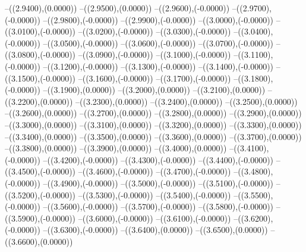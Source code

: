{	--({\sx*(2.9400)},{\sy*(0.0000)})
	--({\sx*(2.9500)},{\sy*(0.0000)})
	--({\sx*(2.9600)},{\sy*(-0.0000)})
	--({\sx*(2.9700)},{\sy*(-0.0000)})
	--({\sx*(2.9800)},{\sy*(-0.0000)})
	--({\sx*(2.9900)},{\sy*(-0.0000)})
	--({\sx*(3.0000)},{\sy*(-0.0000)})
	--({\sx*(3.0100)},{\sy*(-0.0000)})
	--({\sx*(3.0200)},{\sy*(-0.0000)})
	--({\sx*(3.0300)},{\sy*(-0.0000)})
	--({\sx*(3.0400)},{\sy*(-0.0000)})
	--({\sx*(3.0500)},{\sy*(-0.0000)})
	--({\sx*(3.0600)},{\sy*(-0.0000)})
	--({\sx*(3.0700)},{\sy*(-0.0000)})
	--({\sx*(3.0800)},{\sy*(-0.0000)})
	--({\sx*(3.0900)},{\sy*(-0.0000)})
	--({\sx*(3.1000)},{\sy*(-0.0000)})
	--({\sx*(3.1100)},{\sy*(-0.0000)})
	--({\sx*(3.1200)},{\sy*(-0.0000)})
	--({\sx*(3.1300)},{\sy*(-0.0000)})
	--({\sx*(3.1400)},{\sy*(-0.0000)})
	--({\sx*(3.1500)},{\sy*(-0.0000)})
	--({\sx*(3.1600)},{\sy*(-0.0000)})
	--({\sx*(3.1700)},{\sy*(-0.0000)})
	--({\sx*(3.1800)},{\sy*(-0.0000)})
	--({\sx*(3.1900)},{\sy*(0.0000)})
	--({\sx*(3.2000)},{\sy*(0.0000)})
	--({\sx*(3.2100)},{\sy*(0.0000)})
	--({\sx*(3.2200)},{\sy*(0.0000)})
	--({\sx*(3.2300)},{\sy*(0.0000)})
	--({\sx*(3.2400)},{\sy*(0.0000)})
	--({\sx*(3.2500)},{\sy*(0.0000)})
	--({\sx*(3.2600)},{\sy*(0.0000)})
	--({\sx*(3.2700)},{\sy*(0.0000)})
	--({\sx*(3.2800)},{\sy*(0.0000)})
	--({\sx*(3.2900)},{\sy*(0.0000)})
	--({\sx*(3.3000)},{\sy*(0.0000)})
	--({\sx*(3.3100)},{\sy*(0.0000)})
	--({\sx*(3.3200)},{\sy*(0.0000)})
	--({\sx*(3.3300)},{\sy*(0.0000)})
	--({\sx*(3.3400)},{\sy*(0.0000)})
	--({\sx*(3.3500)},{\sy*(0.0000)})
	--({\sx*(3.3600)},{\sy*(0.0000)})
	--({\sx*(3.3700)},{\sy*(0.0000)})
	--({\sx*(3.3800)},{\sy*(0.0000)})
	--({\sx*(3.3900)},{\sy*(0.0000)})
	--({\sx*(3.4000)},{\sy*(0.0000)})
	--({\sx*(3.4100)},{\sy*(-0.0000)})
	--({\sx*(3.4200)},{\sy*(-0.0000)})
	--({\sx*(3.4300)},{\sy*(-0.0000)})
	--({\sx*(3.4400)},{\sy*(-0.0000)})
	--({\sx*(3.4500)},{\sy*(-0.0000)})
	--({\sx*(3.4600)},{\sy*(-0.0000)})
	--({\sx*(3.4700)},{\sy*(-0.0000)})
	--({\sx*(3.4800)},{\sy*(-0.0000)})
	--({\sx*(3.4900)},{\sy*(-0.0000)})
	--({\sx*(3.5000)},{\sy*(-0.0000)})
	--({\sx*(3.5100)},{\sy*(-0.0000)})
	--({\sx*(3.5200)},{\sy*(-0.0000)})
	--({\sx*(3.5300)},{\sy*(-0.0000)})
	--({\sx*(3.5400)},{\sy*(-0.0000)})
	--({\sx*(3.5500)},{\sy*(-0.0000)})
	--({\sx*(3.5600)},{\sy*(-0.0000)})
	--({\sx*(3.5700)},{\sy*(-0.0000)})
	--({\sx*(3.5800)},{\sy*(-0.0000)})
	--({\sx*(3.5900)},{\sy*(-0.0000)})
	--({\sx*(3.6000)},{\sy*(-0.0000)})
	--({\sx*(3.6100)},{\sy*(-0.0000)})
	--({\sx*(3.6200)},{\sy*(-0.0000)})
	--({\sx*(3.6300)},{\sy*(-0.0000)})
	--({\sx*(3.6400)},{\sy*(0.0000)})
	--({\sx*(3.6500)},{\sy*(0.0000)})
	--({\sx*(3.6600)},{\sy*(0.0000)})
}
